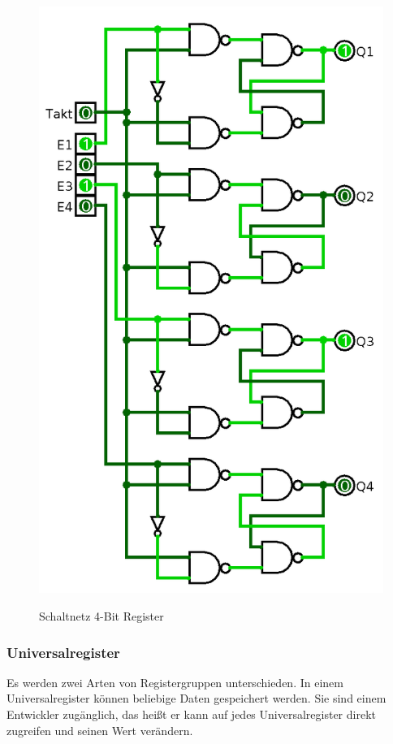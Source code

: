 \documentclass[12pt]{article}
\begin{document}
\newpage
\label{page:4bitreg}
\begin{figure}[!htb]
\centering
\caption{Schaltnetz 4-Bit Register}
\includegraphics[scale=0.35]{4bitreg}
\centering
\label{fig:4bitreg}
\end{figure}
\newpage


\subsubsection{Universalregister}
Es werden zwei Arten von Registergruppen unterschieden. In einem Universalregister können beliebige Daten gespeichert werden. Sie sind einem Entwickler zugänglich, das heißt er kann auf jedes Universalregister direkt zugreifen und seinen Wert verändern. 
\end{document}
